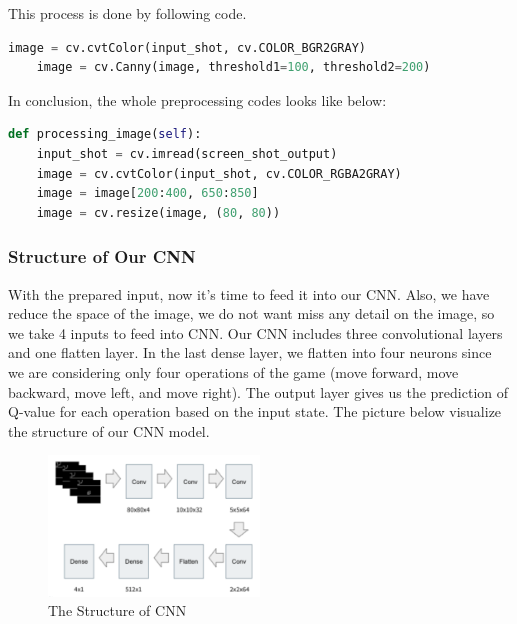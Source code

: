 \documentclass{article}
\begin{document}
This process is done by following code.
\begin{lstlisting}[language=Python]
    image = cv.cvtColor(input_shot, cv.COLOR_BGR2GRAY)
    image = cv.Canny(image, threshold1=100, threshold2=200)
\end{lstlisting}

In conclusion, the whole preprocessing codes looks like below:
\begin{lstlisting}[language=Python]
def processing_image(self):
    input_shot = cv.imread(screen_shot_output)
    image = cv.cvtColor(input_shot, cv.COLOR_RGBA2GRAY)
    image = image[200:400, 650:850]
    image = cv.resize(image, (80, 80))
\end{lstlisting}


\subsubsection{Structure of Our CNN}
With the prepared input, now it's time to feed it into our CNN. Also, we have reduce the space of the image, we do not want miss any detail on the image, so we take 4 inputs to feed into CNN. Our CNN includes three convolutional layers and one flatten layer. In the last dense layer, we flatten into four neurons since we are considering only four operations of the game (move forward, move backward, move left, and move right). The output layer gives us the prediction of Q-value for each operation based on the input state. The picture below visualize the structure of our CNN model. 

\begin{figure}[h]
\caption{The Structure of CNN}
\centering
\includegraphics[width=0.5\textwidth]{CNN.png}
\end{figure}
\end{document}
